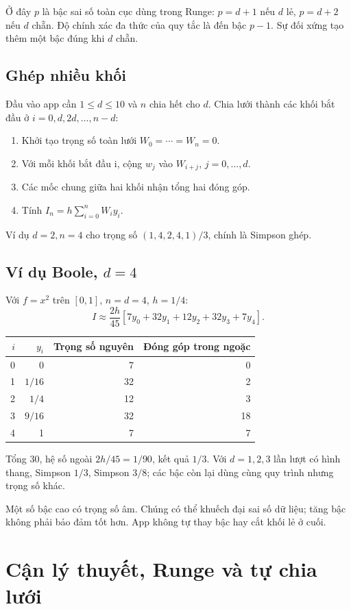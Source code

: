 Ở đây $p$ là bậc sai số toàn cục dùng trong Runge: $p=d+1$ nếu $d$ lẻ, $p=d+2$ nếu $d$ chẵn. Độ chính xác đa thức của quy tắc là đến bậc $p-1$. Sự đối xứng tạo thêm một bậc đúng khi $d$ chẵn.

\subsection{Ghép nhiều khối}
Đầu vào app cần $1\le d\le10$ và $n$ chia hết cho $d$. Chia lưới thành các khối bắt đầu ở $i=0,d,2d,\ldots,n-d$:
\begin{enumerate}
\item Khởi tạo trọng số toàn lưới $W_0=\cdots=W_n=0$.
\item Với mỗi khối bắt đầu i, cộng $w_j$ vào $W_{i+j}$, $j=0,\ldots,d$.
\item Các mốc chung giữa hai khối nhận tổng hai đóng góp.
\item Tính $I_n=h\sum_{i=0}^n W_i y_i$.
\end{enumerate}
Ví dụ $d=2,n=4$ cho trọng số $(1,4,2,4,1)/3$, chính là Simpson ghép.

\subsection{Ví dụ Boole, $d=4$}
Với $f=x^2$ trên $[0,1]$, $n=d=4$, $h=1/4$:
\[
I\approx\frac{2h}{45}[7y_0+32y_1+12y_2+32y_3+7y_4].
\]
\begin{center}\begin{tabular}{rrrr}
\toprule $i$&$y_i$&Trọng số nguyên&Đóng góp trong ngoặc\\\midrule
0&0&7&0\\
1&$1/16$&32&2\\
2&$1/4$&12&3\\
3&$9/16$&32&18\\
4&1&7&7\\\bottomrule
\end{tabular}\end{center}
Tổng $30$, hệ số ngoài $2h/45=1/90$, kết quả $1/3$. Với $d=1,2,3$ lần lượt có hình thang, Simpson $1/3$, Simpson $3/8$; các bậc còn lại dùng cùng quy trình nhưng trọng số khác.

Một số bậc cao có trọng số âm. Chúng có thể khuếch đại sai số dữ liệu; tăng bậc không phải bảo đảm tốt hơn. App không tự thay bậc hay cắt khối lẻ ở cuối.

\section{Cận lý thuyết, Runge và tự chia lưới}
\label{sec:quadrature-adaptive}
